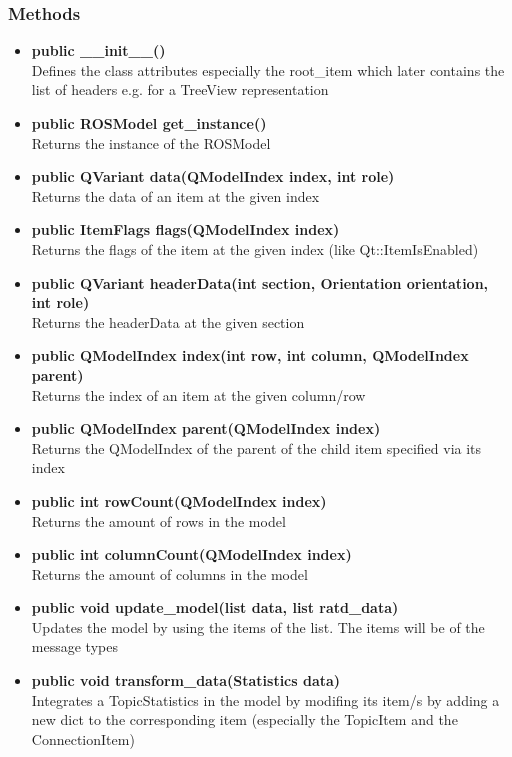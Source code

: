 \subsubsection{Methods}
\begin{itemize}
  \item \textbf{public \_\_init\_\_()}\\ 
  Defines the class attributes especially the root\_item which later contains the list of headers e.g. for a TreeView representation
  \item \textbf{public ROSModel get\_instance()}\\
  Returns the instance of the ROSModel
  \item \textbf{public QVariant data(QModelIndex index, int role)}\\
  Returns the data of an item at the given index
  \item \textbf{public ItemFlags flags(QModelIndex index)}\\
  Returns the flags of the item at the given index (like Qt::ItemIsEnabled)
  \item \textbf{public QVariant headerData(int section, Orientation orientation, int role)}\\ 
  Returns the headerData  at the given section
  \item \textbf{public QModelIndex index(int row, int column, QModelIndex parent)}\\
  Returns the index of an item at the given column/row
  \item \textbf{public QModelIndex parent(QModelIndex index)}\\ 
  Returns the QModelIndex of the parent of the child item specified via its index
  \item \textbf{public int rowCount(QModelIndex index)}\\ 
  Returns the amount of rows in the model
  \item \textbf{public int columnCount(QModelIndex index)}\\
  Returns the amount of columns in the model
  \item \textbf{public void update\_model(list data, list ratd\_data)}\\ 
  Updates the model by using the items of the list. The items will be of the message types 
  \item \textbf{public void transform\_data(Statistics data)}\\ 
  Integrates a TopicStatistics in the model by modifing its item/s by adding a new dict to the corresponding item (especially the TopicItem and the ConnectionItem)

\end{itemize}
